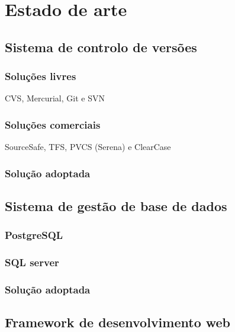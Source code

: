 



\chapter{Estado de arte}





\section{Sistema de controlo de versões}

\subsection{Soluções livres}
CVS, Mercurial, Git e SVN


\subsection{Soluções comerciais}
SourceSafe, TFS, PVCS (Serena) e ClearCase


\subsection{Solução adoptada}





\section{Sistema de gestão de base de dados}


\subsection{PostgreSQL}


\subsection{SQL server}



\subsection{Solução adoptada}



\section{Framework de desenvolvimento web}


